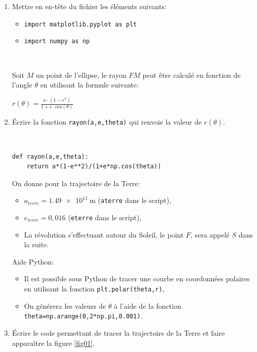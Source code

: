 \begin{enumerate}
\item  Mettre en en-tête du fichier les éléments suivants:
 \begin{itemize}
  \item \verb?import matplotlib.pyplot as plt?
  \item \verb?import numpy as np?
 \end{itemize}

~\

Soit $M$ un point de l'ellipse, le rayon $FM$ peut être calculé en fonction de l'angle $\theta$ en utilisant la formule suivante:

\begin{center}
$r(\theta)=\frac{a\cdot (1-e^2)}{1+e\cdot cos(\theta)}$
\end{center}

\item Écrire la fonction \verb?rayon(a,e,theta)? qui renvoie la valeur de $r(\theta)$.

\begin{solution}~\ \\
\begin{verbatim}
def rayon(a,e,theta):
    return a*(1-e**2)/(1+e*np.cos(theta))
\end{verbatim}
\end{solution}
 
On donne pour la trajectoire de la Terre:
\begin{itemize}
\item $a_{terre}=\SI{1,49e11}{\meter}$ (\verb?aterre? dans le script),
\item $e_{terre}=0,016$ (\verb?eterre? dans le script),
\item La révolution s'effectuant autour du Soleil, le point $F$, sera appelé $S$ dans la suite.
\end{itemize}

Aide Python:
\begin{itemize}
 \item Il est possible sous Python de tracer une courbe en coordonnées polaires en utilisant la fonction \verb?plt.polar(theta,r)?,
 \item On générera les valeurs de $\theta$ à l'aide de la fonction \verb?theta=np.arange(0,2*np.pi,0.001)?.
\end{itemize}

\item Écrire le code permettant de tracer la trajectoire de la Terre et faire apparaître la figure \ref{fig01}.


\end{enumerate}
